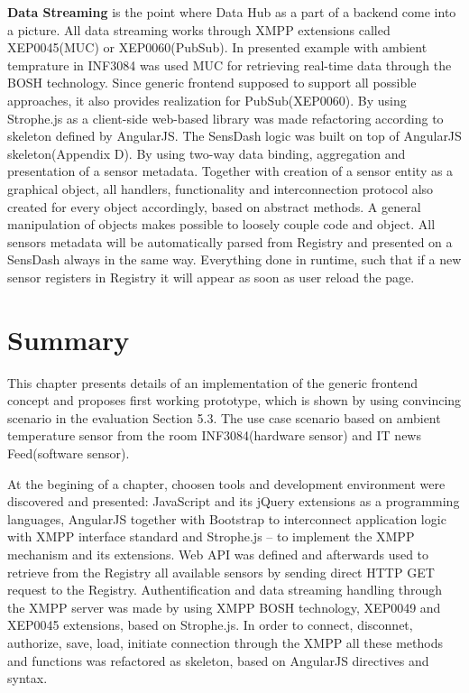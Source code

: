 \textbf{Data Streaming} is the point where Data Hub as a part of a backend come into a picture. All data streaming works through XMPP extensions called XEP0045(MUC) or XEP0060(PubSub). In presented example with ambient temprature in INF3084 was used MUC for retrieving real-time data through the BOSH technology. Since generic frontend supposed to support all possible approaches, it also provides realization for PubSub(XEP0060). By using Strophe.js as a client-side web-based library was made refactoring according to skeleton defined by AngularJS. 
\newline
The SensDash logic was built on top of AngularJS skeleton(Appendix D). By using two-way data binding, aggregation and presentation of a sensor metadata. Together with creation of a sensor entity as a graphical object, all handlers, functionality and interconnection protocol also created for every object accordingly, based on abstract methods. A general manipulation of objects makes possible to loosely couple code and object. All sensors metadata will be automatically parsed from Registry and presented on a SensDash always in the same way. Everything done in runtime, such that if a new sensor registers in Registry it will appear as soon as user reload the page. 

\section{Summary}
This chapter presents details of an implementation of the generic frontend concept and proposes first working prototype, which is shown by using convincing scenario in the evaluation Section 5.3. The use case scenario based on ambient temperature sensor from the room INF3084(hardware sensor) and IT news Feed(software sensor).

At the begining of a chapter, choosen tools and development environment were discovered and presented: JavaScript and its jQuery extensions as a programming languages, AngularJS together with Bootstrap to interconnect application logic with XMPP interface standard and Strophe.js -- to implement the XMPP mechanism and its extensions. Web API was defined and afterwards used to retrieve from the Registry all available sensors by sending direct HTTP GET request to the Registry. Authentification and data streaming handling through the XMPP server was made by using XMPP BOSH technology, XEP0049 and XEP0045 extensions, based on Strophe.js. In order to connect, disconnet, authorize, save, load, initiate connection through the XMPP all these methods and functions was refactored as skeleton, based on AngularJS directives and syntax. 

